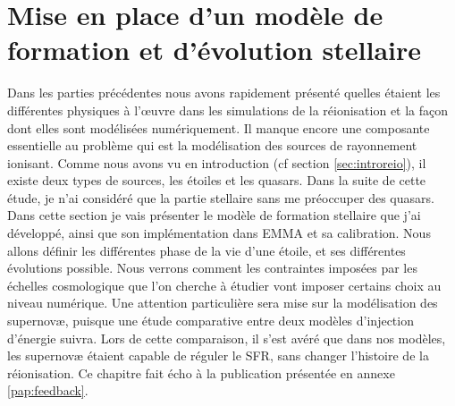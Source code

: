 \chapter{Mise en place d'un modèle de formation et d'évolution stellaire}
\label{sec:etoiles}

Dans les parties précédentes nous avons rapidement présenté quelles étaient les différentes physiques à l’œuvre dans les simulations de la réionisation et la façon dont elles sont modélisées numériquement.
Il manque encore une composante essentielle au problème qui est la modélisation des sources de rayonnement ionisant.
Comme nous avons vu en introduction (cf section \ref{sec:introreio}), il existe deux types de sources, les étoiles et les quasars.
Dans la suite de cette étude, je n'ai considéré que la partie stellaire sans me préoccuper des quasars.
Dans cette section je vais présenter le modèle de formation stellaire que j'ai développé, ainsi que son implémentation dans EMMA et sa calibration.
Nous allons définir les différentes phase de la vie d'une étoile, et ses différentes évolutions possible.
Nous verrons comment les contraintes imposées par les échelles cosmologique que l'on cherche à étudier vont imposer certains choix au niveau numérique.
Une attention particulière sera mise sur la modélisation des supernovæ, puisque une étude comparative entre deux modèles d'injection d'énergie suivra.
Lors de cette comparaison, il s'est avéré que dans nos modèles, les supernovæ étaient capable de réguler le \ac{SFR}, sans changer l'histoire de la réionisation.
Ce chapitre fait écho à la publication présentée en annexe \ref{pap:feedback}.
%


